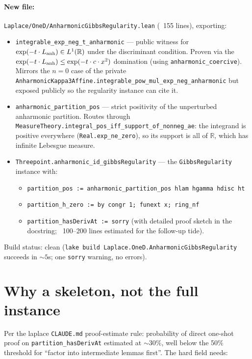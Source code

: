 \documentclass[11pt]{article}
\begin{document}
\paragraph{New file:} \texttt{Laplace/OneD/AnharmonicGibbsRegularity.lean}
(~155 lines), exporting:

\begin{itemize}[noitemsep,leftmargin=*]
\item \texttt{integrable\_exp\_neg\_t\_anharmonic} — public witness for
  $\exp(-t \cdot L_{\rm anh}) \in L^1(\mathbb{R})$ under the
  discriminant condition. Proven via the
  $\exp(-t \cdot L_{\rm anh}) \leq \exp(-t \cdot c \cdot x^2)$
  domination (using \texttt{anharmonic\_coercive}). Mirrors the $n=0$
  case of the private
  \texttt{AnharmonicKappa3Affine.integrable\_pow\_mul\_exp\_neg\_anharmonic}
  but exposed publicly so the regularity instance can cite it.

\item \texttt{anharmonic\_partition\_pos} — strict positivity of the
  unperturbed anharmonic partition. Routes through
  \texttt{MeasureTheory.integral\_pos\_iff\_support\_of\_nonneg\_ae}:
  the integrand is positive everywhere (\texttt{Real.exp\_ne\_zero}),
  so its support is all of $\mathbb{R}$, which has infinite Lebesgue
  measure.

\item \texttt{Threepoint.anharmonic\_id\_gibbsRegularity} — the
  \texttt{GibbsRegularity} instance with:
  \begin{itemize}[noitemsep]
  \item \texttt{partition\_pos := anharmonic\_partition\_pos hlam hgamma hdisc ht}
  \item \texttt{partition\_h\_zero := by congr 1; funext x; ring\_nf}
  \item \texttt{partition\_hasDerivAt := sorry} (with detailed proof
    sketch in the docstring; ~100--200 lines estimated for the
    follow-up tide).
  \end{itemize}
\end{itemize}

Build status: clean (\texttt{lake build Laplace.OneD.AnharmonicGibbsRegularity}
succeeds in $\sim 5$s; one \texttt{sorry} warning, no errors).

\section{Why a skeleton, not the full instance}

Per the laplace \texttt{CLAUDE.md} proof-estimate rule: probability of
direct one-shot proof on \texttt{partition\_hasDerivAt} estimated at
$\sim 30\%$, well below the 50\% threshold for ``factor into
intermediate lemmas first''. The hard field needs:
\end{document}
